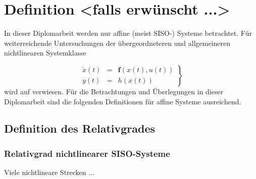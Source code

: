 \setcounter{equation}{0}

\clearpage


\chapter{Definition <falls erwünscht ...>}

In dieser Diplomarbeit werden nur affine (meist SISO-) Systeme betrachtet.
Für weiterreichende Untersuchungen der übergeordneteren und allgemeineren
nichtlinearen Systemklasse 

\begin{equation}
\left.\begin{array}{ccl}
\dot{x}(t) & = & \mathbf{f}(x(t),u(t))\\
y(t) & = & h(x(t))\end{array}\right\} \label{eq:SISO-allgemeine-nichlineare-Systembeschreibung}\end{equation}
wird auf \cite{Paper_Minimum-Phase-Nonlinear-Systems-A-New-Definition,Paper_Output-Input-Stability-and-Minimum-Phase-Nonlinear-Systems,Paper_A-New-Definition-of-the-Minimum-Phase-Property-for-Nonlinear-Systems-with-an-Application-to-Adaptive-Control,Paper_Smooth-Stabilzation-Implies-Coprime-Factorization}
verwiesen. Für die Betrachtungen und Überlegungen in dieser Diplomarbeit
sind die folgenden Definitionen für affine Systeme ausreichend. 


\section{Definition des Relativgrades}


\subsection{Relativgrad nichtlinearer SISO-Systeme}

Viele nichtlineare Strecken ...

\newpage

\mbox{}

\thispagestyle{empty}
